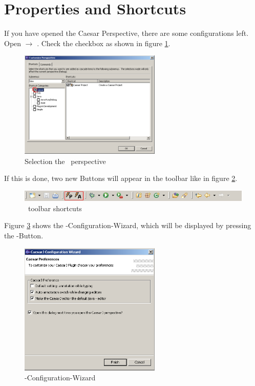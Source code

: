 \section{Properties and Shortcuts}
If you have opened the Caesar Perspective, there are some configurations left. Open  $\rightarrow$ . Check the  checkbox as shown in figure \ref{fig:propert}.

\begin{figure}[htbp]
	\centering
		\includegraphics[width=0.60\textwidth]{images/propert.png}
	\caption{Selection the \caesarj ~perspective}
	\label{fig:propert}
\end{figure}

If this is done, two new Buttons will appear in the toolbar like in figure \ref{fig:toolbar}.

\begin{figure}[htbp]
	\centering
		\includegraphics[width=1.0\textwidth]{images/toolbar.png}
	\caption{\caesarj ~toolbar shortcuts}
	\label{fig:toolbar}
\end{figure}

Figure \ref{fig:properties} shows the \caesarj -Configuration-Wizard, which will be displayed by pressing the -Button.

\begin{figure}[htbp]
	\centering
		\includegraphics[width=0.60\textwidth]{images/view_properties.png}
	\caption{\caesarj -Configuration-Wizard}
	\label{fig:properties}
\end{figure}

